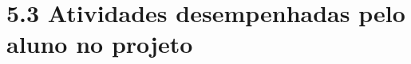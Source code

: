 \hypertarget{__RefHeading___Toc4843_3118176633}{}
\section*{5.3 Atividades desempenhadas pelo aluno no projeto}
\label{ages-iv:text-h-0115}

